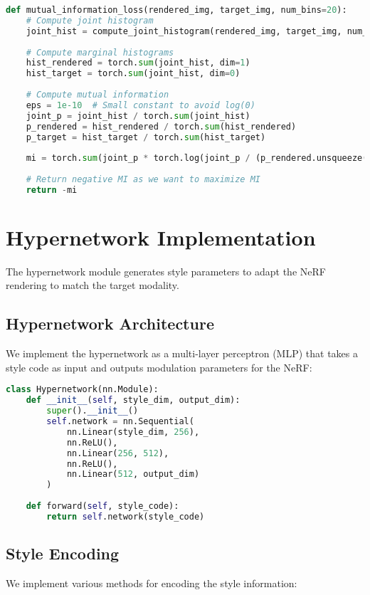 \begin{lstlisting}[language=Python]
def mutual_information_loss(rendered_img, target_img, num_bins=20):
    # Compute joint histogram
    joint_hist = compute_joint_histogram(rendered_img, target_img, num_bins)
    
    # Compute marginal histograms
    hist_rendered = torch.sum(joint_hist, dim=1)
    hist_target = torch.sum(joint_hist, dim=0)
    
    # Compute mutual information
    eps = 1e-10  # Small constant to avoid log(0)
    joint_p = joint_hist / torch.sum(joint_hist)
    p_rendered = hist_rendered / torch.sum(hist_rendered)
    p_target = hist_target / torch.sum(hist_target)
    
    mi = torch.sum(joint_p * torch.log(joint_p / (p_rendered.unsqueeze(1) * p_target.unsqueeze(0)) + eps))
    
    # Return negative MI as we want to maximize MI
    return -mi
\end{lstlisting}

\section{Hypernetwork Implementation}
The hypernetwork module generates style parameters to adapt the NeRF rendering to match the target modality.

\subsection{Hypernetwork Architecture}
We implement the hypernetwork as a multi-layer perceptron (MLP) that takes a style code as input and outputs modulation parameters for the NeRF:

\begin{lstlisting}[language=Python]
class Hypernetwork(nn.Module):
    def __init__(self, style_dim, output_dim):
        super().__init__()
        self.network = nn.Sequential(
            nn.Linear(style_dim, 256),
            nn.ReLU(),
            nn.Linear(256, 512),
            nn.ReLU(),
            nn.Linear(512, output_dim)
        )
    
    def forward(self, style_code):
        return self.network(style_code)
\end{lstlisting}

\subsection{Style Encoding}
We implement various methods for encoding the style information:


